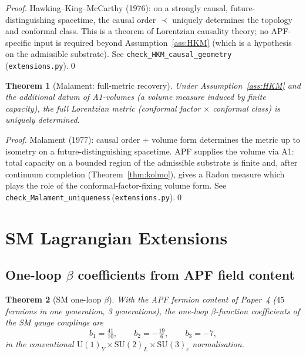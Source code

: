 \documentclass[11pt,a4paper]{article}
\newtheorem{theorem}{Theorem}[section]
\theoremstyle{definition}
\newcommand{\SU}[1]{\mathrm{SU}(#1)}
\newcommand{\U}[1]{\mathrm{U}(#1)}
\newcommand{\coderef}[2]{\texttt{#1}\,(\texttt{#2})}
\begin{document}
\begin{proof}
Hawking--King--McCarthy (1976): on a strongly causal, future-distinguishing spacetime, the causal order $\prec$ uniquely determines the topology and conformal class.  This is a theorem of Lorentzian causality theory; no APF-specific input is required beyond Assumption~\ref{ass:HKM} (which is a hypothesis on the admissible substrate).  See \coderef{check\_HKM\_causal\_geometry}{extensions.py}.\qed
\end{proof}

\begin{theorem}[Malament: full-metric recovery]
\label{thm:Malament}
Under Assumption~\ref{ass:HKM} and the additional datum of A1-volumes (a volume measure induced by finite capacity), the full Lorentzian metric (conformal factor $\times$ conformal class) is uniquely determined.
\end{theorem}

\begin{proof}
Malament (1977): causal order + volume form determines the metric up to isometry on a future-distinguishing spacetime.  APF supplies the volume via A1: total capacity on a bounded region of the admissible substrate is finite and, after continuum completion (Theorem~\ref{thm:kolmo}), gives a Radon measure which plays the role of the conformal-factor-fixing volume form.  See \coderef{check\_Malament\_uniqueness}{extensions.py}.\qed
\end{proof}

\section{SM Lagrangian Extensions}\label{sec:SMext}
\setcounter{theorem}{0}

\subsection{One-loop $\beta$ coefficients from APF field content}

\begin{theorem}[SM one-loop $\beta$]
\label{thm:beta}
With the APF fermion content of Paper~4 ($45$ fermions in one generation, 3 generations), the one-loop $\beta$-function coefficients of the SM gauge couplings are
\[
   b_1 = \tfrac{41}{10},\qquad b_2 = -\tfrac{19}{6},\qquad b_3 = -7,
\]
in the conventional $\U{1}_Y\times \SU{2}_L\times \SU{3}_c$ normalisation.
\end{theorem}
\end{document}
